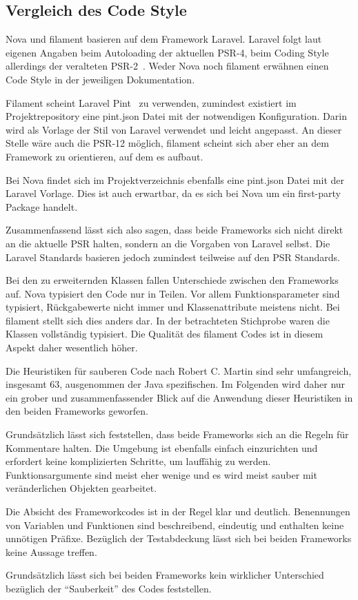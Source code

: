 \subsection{Vergleich des Code Style}
Nova und filament basieren auf dem Framework Laravel.
Laravel folgt laut eigenen Angaben beim Autoloading der aktuellen PSR-4, beim Coding Style allerdings der veralteten PSR-2~\cite{laravel-docs-coding-style}.
Weder Nova noch filament erwähnen einen Code Style in der jeweiligen Dokumentation.

Filament scheint Laravel Pint~\cite{laravel-docs-pint} zu verwenden, zumindest existiert im Projektrepository eine pint.json Datei mit der notwendigen Konfiguration.
Darin wird als Vorlage der Stil von Laravel verwendet und leicht angepasst.
An dieser Stelle wäre auch die PSR-12 möglich, filament scheint sich aber eher an dem Framework zu orientieren, auf dem es aufbaut.

Bei Nova findet sich im Projektverzeichnis ebenfalls eine pint.json Datei mit der Laravel Vorlage.
Dies ist auch erwartbar, da es sich bei Nova um ein first-party Package handelt.

Zusammenfassend lässt sich also sagen, dass beide Frameworks sich nicht direkt an die aktuelle PSR halten, sondern an die Vorgaben von Laravel selbst.
Die Laravel Standards basieren jedoch zumindest teilweise auf den PSR Standards.

Bei den zu erweiternden Klassen fallen Unterschiede zwischen den Frameworks auf.
Nova typisiert den Code nur in Teilen.
Vor allem Funktionsparameter sind typisiert, Rückgabewerte nicht immer und Klassenattribute meistens nicht.
Bei filament stellt sich dies anders dar.
In der betrachteten Stichprobe waren die Klassen vollständig typisiert.
Die Qualität des filament Codes ist in diesem Aspekt daher wesentlich höher.

Die Heuristiken für sauberen Code nach Robert C. Martin sind sehr umfangreich, insgesamt 63, ausgenommen der Java spezifischen.
Im Folgenden wird daher nur ein grober und zusammenfassender Blick auf die Anwendung dieser Heuristiken in den beiden Frameworks geworfen.

Grundsätzlich lässt sich feststellen, dass beide Frameworks sich an die Regeln für Kommentare halten.
Die Umgebung ist ebenfalls einfach einzurichten und erfordert keine komplizierten Schritte, um lauffähig zu werden.
Funktionsargumente sind meist eher wenige und es wird meist sauber mit veränderlichen Objekten gearbeitet.

Die Absicht des Frameworkcodes ist in der Regel klar und deutlich.
Benennungen von Variablen und Funktionen sind beschreibend, eindeutig und enthalten keine unnötigen Präfixe.
Bezüglich der Testabdeckung lässt sich bei beiden Frameworks keine Aussage treffen.

Grundsätzlich lässt sich bei beiden Frameworks kein wirklicher Unterschied bezüglich der \enquote{Sauberkeit} des Codes feststellen.
